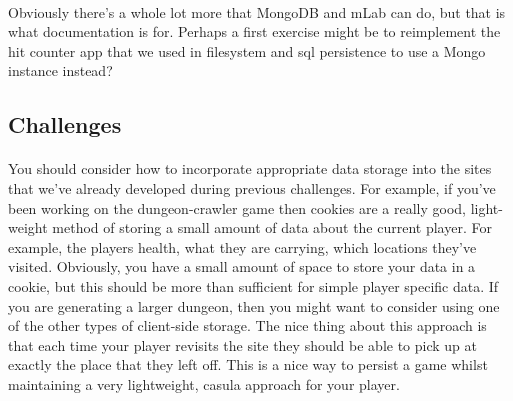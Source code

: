 \documentclass[10pt, a4paper, twosize]{article}
\begin{document}
\paragraph{} Obviously there's a whole lot more that MongoDB and mLab can do, but that is what documentation is for. Perhaps a first exercise might be to reimplement the hit counter app that we used in filesystem and sql persistence to use a Mongo instance instead?

\subsection{Challenges}
\paragraph{} You should consider how to incorporate appropriate data storage into the sites that we've already developed during previous challenges. For example, if you've been working on the dungeon-crawler game then cookies are a really good, light-weight method of storing a small amount of data about the current player. For example, the players health, what they are carrying, which locations they've visited. Obviously, you have a small amount of space to store your data in a cookie, but this should be more than sufficient for simple player specific data. If you are generating a larger dungeon, then you might want to consider using one of the other types of client-side storage. The nice thing about this approach is that each time your player revisits the site they should be able to pick up at exactly the place that they left off. This is a nice way to persist a game whilst maintaining a very lightweight, casula approach for your player.
\end{document}
